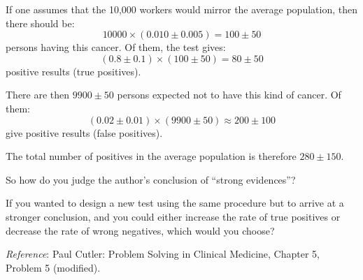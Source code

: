 If one assumes that the 10,000 workers would mirror the average population, then there should be:
\begin{equation}
    10000 \times (0.010 \pm 0.005) = 100 \pm 50
\end{equation}
persons having this cancer. Of them, the test gives:
\begin{equation}
    (0.8 \pm 0.1) \times (100 \pm 50) = 80 \pm 50
\end{equation}
positive results (true positives).\myskip

There are then $9900 \pm 50$ persons expected not to have this kind of cancer. Of them:
\begin{equation}
    (0.02 \pm 0.01) \times (9900 \pm 50) \approx 200 \pm 100
\end{equation}
give positive results (false positives).\myskip

The total number of positives in the average population is therefore $280 \pm 150$.\myskip

So how do you judge the author's conclusion of ``strong evidences''?\myskip

If you wanted to design a new test using the same procedure but to arrive at a stronger conclusion, and you could either increase the rate of true positives or decrease the rate of wrong negatives, which would you choose?\myskip

\noindent\emph{Reference}: Paul Cutler: Problem Solving in Clinical Medicine, Chapter 5, Problem 5 (modified).
